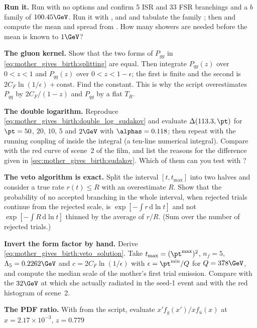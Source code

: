 \begin{exercises}
\item \textbf{Run it.} Run  with no
  options and confirm 5 ISR and 33 FSR branchings and a $b$ family of
  $100.45\GeV$. Run it with ,  and  and
  tabulate the family \pt; then 
  and compute the mean and spread from . How many
  showers are needed before the mean is known to $1\GeV$?
\item \textbf{The gluon kernel.} Show that the two forms of $P_{gg}$ in
  \cref{eq:mother_gives_birth:splitting} are equal. Then integrate
  $P_{qg}(z)$ over $0<z<1$ and $P_{qq}(z)$ over $0<z<1-\epsilon$; the first
  is finite and the second is $2C_F\ln(1/\epsilon)+\text{const}$. Find
  the constant. This is why the script overestimates $P_{qq}$ by
  $2C_F/(1-z)$ and $P_{qg}$ by a flat $T_R$.
\item \textbf{The double logarithm.} Reproduce
  \cref{eq:mother_gives_birth:double_log_sudakov} and evaluate
  $\Delta(113.3,\pt)$ for $\pt=50$, $20$, $10$, $5$ and $2\GeV$ with
  $\alphas=0.118$; then repeat with the running coupling of
   inside the integral (a ten-line numerical integral).
  Compare with the red curve of scene~2 of the film, and list the reasons
  for the difference given in \cref{sec:mother_gives_birth:sudakov}. Which
  of them can you test with ?
\item \textbf{The veto algorithm is exact.} Split the interval
  $[t,t_{\max}]$ into two halves and consider a true rate $r(t)\le R$
  with an overestimate $R$. Show that the probability of no accepted
  branching in the whole interval, when rejected trials continue from the
  rejected scale, is $\exp[-\int r\,\mathrm{d}\ln t]$ and not
  $\exp[-\int R\,\mathrm{d}\ln t]$ thinned by the average of $r/R$.
  (Sum over the number of rejected trials.)
\item \textbf{Invert the form factor by hand.} Derive
  \cref{eq:mother_gives_birth:veto_solution}. Take $t_{\max}=(\pt^{\max})^2$,
  $n_f=5$, $\Lambda_5=0.2262\GeV$ and $c=2C_F\ln(1/\epsilon)$ with
  $\epsilon=\pt^{\min}/Q$ for $Q=378\GeV$, and compute the median scale of
  the mother's first trial emission. Compare with the $32\GeV$ at which she
  actually radiated in the seed-1 event and with the red histogram of
  scene~2.
\item \textbf{The PDF ratio.} With  from the script,
  evaluate $x'f_g(x')/xf_{\bar u}(x)$ at $x=2.17\times10^{-3}$, $z=0.779$

\end{exercises}
